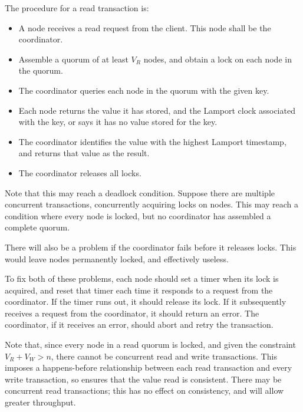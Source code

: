 \documentclass[12pt,a4paper]{article}
\begin{document}
The procedure for a read transaction is:

\begin{itemize}
  \item
  A node receives a read request from the client. This node shall be the coordinator.

  \item
  Assemble a quorum of at least $V_R$ nodes, and obtain a lock on each node in the quorum.

  \item
  The coordinator queries each node in the quorum with the given key.

  \item
  Each node returns the value it has stored, and the Lamport clock associated with the key, or says it has no value stored for the key.

  \item
  The coordinator identifies the value with the highest Lamport timestamp, and returns that value as the result.

  \item
  The coordinator releases all locks.

\end{itemize}

Note that this may reach a deadlock condition. Suppose there are multiple concurrent transactions, concurrently acquiring locks on nodes. This may reach a condition where every node is locked, but no coordinator has assembled a complete quorum.

There will also be a problem if the coordinator fails before it releases locks. This would leave nodes permanently locked, and effectively useless.

To fix both of these problems, each node should set a timer when its lock is acquired, and reset that timer each time it responds to a request from the coordinator. If the timer runs out, it should release its lock. If it subsequently receives a request from the coordinator, it should return an error. The coordinator, if it receives an error, should abort and retry the transaction.

Note that, since every node in a read quorum is locked, and given the constraint $V_R + V_W > n$, there cannot be concurrent read and write transactions. This imposes a happens-before relationship between each read transaction and every write transaction, so ensures that the value read is consistent. There may be concurrent read transactions; this has no effect on consistency, and will allow greater throughput.
\end{document}
